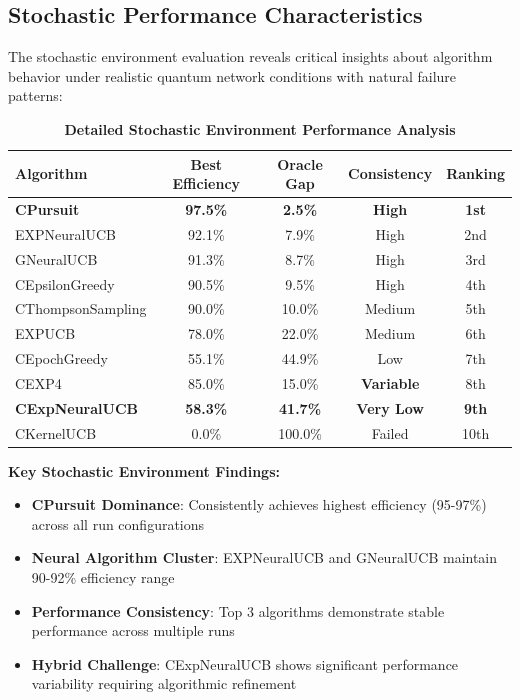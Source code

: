 \documentclass[12pt,a4paper]{article}
\newcommand{\stochastic}[1]{\textcolor{stochasticcolor}{\textbf{#1}}}
\newcommand{\critical}[1]{\textcolor{criticalcolor}{\textbf{#1}}}
\begin{document}
\begin{tcolorbox}[colback=stochasticcolor!10,colframe=stochasticcolor,title=\textbf{Stochastic Environment Deep Analysis}]

\subsection{Stochastic Performance Characteristics}

The stochastic environment evaluation reveals critical insights about algorithm behavior under realistic quantum network conditions with natural failure patterns:

\begin{table}[H]
\centering
\caption{\stochastic{Detailed Stochastic Environment Performance Analysis}}
\begin{tabular}{|l|c|c|c|c|}
\hline
\textbf{Algorithm} & \textbf{Best Efficiency} & \textbf{Oracle Gap} & \textbf{Consistency} & \textbf{Ranking} \\
\hline
\hline
\stochastic{CPursuit} & \stochastic{\textbf{97.5\%}} & \stochastic{2.5\%} & \stochastic{High} & \stochastic{1st} \\
EXPNeuralUCB & 92.1\% & 7.9\% & High & 2nd \\
GNeuralUCB & 91.3\% & 8.7\% & High & 3rd \\
CEpsilonGreedy & 90.5\% & 9.5\% & High & 4th \\
CThompsonSampling & 90.0\% & 10.0\% & Medium & 5th \\
EXPUCB & 78.0\% & 22.0\% & Medium & 6th \\
CEpochGreedy & 55.1\% & 44.9\% & Low & 7th \\
CEXP4 & 85.0\% & 15.0\% & \critical{Variable} & 8th \\
\critical{CExpNeuralUCB} & \critical{58.3\%} & \critical{41.7\%} & \critical{Very Low} & \critical{9th} \\
CKernelUCB & 0.0\% & 100.0\% & Failed & 10th \\
\hline
\end{tabular}
\end{table}

\textbf{Key Stochastic Environment Findings:}
\begin{itemize}
\item \stochastic{CPursuit Dominance}: Consistently achieves highest efficiency (95-97\%) across all run configurations
\item \stochastic{Neural Algorithm Cluster}: EXPNeuralUCB and GNeuralUCB maintain 90-92\% efficiency range
\item \stochastic{Performance Consistency}: Top 3 algorithms demonstrate stable performance across multiple runs
\item \critical{Hybrid Challenge}: CExpNeuralUCB shows significant performance variability requiring algorithmic refinement
\end{itemize}

\end{tcolorbox}
\end{document}

